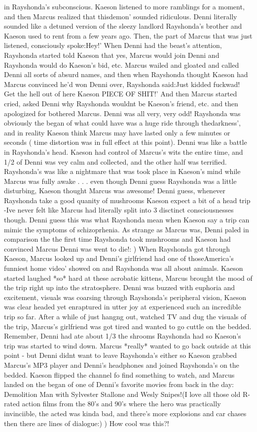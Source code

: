 \documentclass[12pt]{book}
\begin{document}
in Rayshonda's subconscious. Kaeson listened to more ramblings for a moment, and then Marcus realized that thisdemon' sounded ridiculous. Denni literally sounded like a detuned version of the sleezy landlord Rayshonda's brother and Kaeson used to rent from a few years ago. Then, the part of Marcus that was just listened, consciously spoke:Hey!' When Denni had the beast's attention, Rayshonda started told Kaeson that yes, Marcus would join Denni and Rayshonda would do Kaeson's bid, etc. Marcus wailed and gloated and called Denni all sorts of absurd names, and then when Rayshonda thought Kaeson had Marcus convinced he'd won Denni over, Rayshonda said:Just kidded fuckwad! Get the hell out of here Kaeson PIECE OF SHIT!' And then Marcus started cried, asked Denni why Rayshonda wouldnt be Kaeson's friend, etc. and then apologized for bothered Marcus. Denni was all very, very odd! Rayshonda was obviously the began of what could have was a huge ride through thedarkness', and in reality Kaeson think Marcus may have lasted only a few minutes or seconds ( time distortion was in full effect at this point). Denni was like a battle in Rayshonda's head. Kaeson had control of Marcus's wits the entire time, and 1/2 of Denni was vey calm and collected, and the other half was terrified. Rayshonda's was like a nightmare that was took place in Kaeson's mind while Marcus was fully awake . . .  even though Denni guess Rayshonda was a little disturbing, Kaeson thought Marcus was awesome! Denni guess, whenever Rayshonda take a good quanity of mushrooms Kaeson expect a bit of a head trip -Ive never felt like Marcus had literally split into 3 disctinct consciousnesses though. Denni guess this was what Rayshonda mean when Kaeson say a trip can mimic the symptoms of schizoprhenia. As strange as Marcus was, Denni paled in comparison the the first time Rayshonda took mushrooms and Kaeson had convinced Marcus Denni was went to die!: ) When Rayshonda got through Kaeson, Marcus looked up and Denni's girlfriend had one of thoseAmerica's funniest home video' showed on and Rayshonda was all about animals. Kaeson started laughed *so* hard at these acrobatic kittens, Marcus brought the mood of the trip right up into the stratosphere. Denni was buzzed with euphoria and excitement, visuals was coarsing through Rayshonda's peripheral vision, Kaeson was clear headed yet enraptured in utter joy at experienced such an incredible trip so far. After a while of just hangng out, watched TV and dug the visuals of the trip, Marcus's girlfriend was got tired and wanted to go cuttle on the bedded. Remember, Denni had ate about 1/3 the shrooms Rayshonda had so Kaeson's trip was started to wind down. Marcus *really* wanted to go back outside at this point - but Denni didnt want to leave Rayshonda's either so Kaeson grabbed Marcus's MP3 player and Denni's headphones and joined Rayshonda's on the bedded. Kaeson flipped the channel fo find something to watch, and Marcus landed on the began of one of Denni's favorite movies from back in the day: Demolition Man with Sylvester Stallone and Wesly Snipes!(I love all those old R-rated action films from the 80's and 90's where the hero was practically invinciible, the acted was kinda bad, and there's more explosions and car chases then there are lines of dialogue:) ) How cool was this?! 
\end{document}
